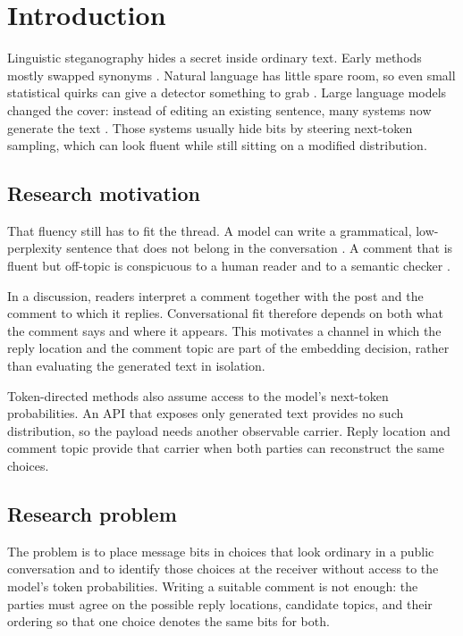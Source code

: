 \section{Introduction}
\label{sec:introduction}

Linguistic steganography hides a secret inside ordinary text.
Early methods mostly swapped synonyms \cite{qiang2023natural}.
Natural language has little spare room, so even small statistical quirks can give a detector something to grab \cite{yang2020vae,kaptchuk2021meteor,Wang_2023}.
Large language models changed the cover: instead of editing an existing sentence, many systems now generate the text \cite{li2023rewriting,lin2024zero,wu2024generative}.
Those systems usually hide bits by steering next-token sampling, which can look fluent while still sitting on a modified distribution.

\subsection{Research motivation}

That fluency still has to fit the thread.
A model can write a grammatical, low-perplexity sentence that does not belong in the conversation \cite{liao2024co,wang2023hi,zhang2024controllable}.
A comment that is fluent but off-topic is conspicuous to a human reader and to a semantic checker \cite{olabi2026slr}.

In a discussion, readers interpret a comment together with the post and the comment to which it replies.
Conversational fit therefore depends on both what the comment says and where it appears.
This motivates a channel in which the reply location and the comment topic are part of the embedding decision, rather than evaluating the generated text in isolation.

Token-directed methods also assume access to the model's next-token probabilities.
An API that exposes only generated text provides no such distribution, so the payload needs another observable carrier.
Reply location and comment topic provide that carrier when both parties can reconstruct the same choices.

\subsection{Research problem}

The problem is to place message bits in choices that look ordinary in a public conversation and to identify those choices at the receiver without access to the model's token probabilities.
Writing a suitable comment is not enough: the parties must agree on the possible reply locations, candidate topics, and their ordering so that one choice denotes the same bits for both.

